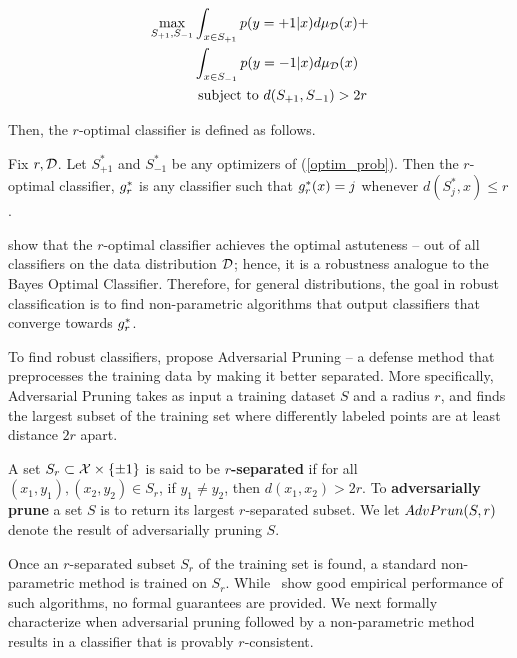 \begin{equation}\label{optim_prob}
\begin{split}
\max_{S_{+1}, S_{-1}} &\int_{x \in S_{+1}} p(y=+1|x)d\mu_{{\mathcal D}}(x) + \\
&\int_{x \in S_{-1}} p(y=-1|x)d\mu_{{\mathcal D}}(x) \\
&\text{ subject to } d(S_{+1}, S_{-1}) > 2r 
\end{split}
\end{equation}

Then, the $r$-optimal classifier is defined as follows. 

\begin{defn}
\cite{YRWC19} Fix $r, {\mathcal D}$. Let $S_{+1}^*$ and $S_{-1}^*$ be any optimizers of (\ref{optim_prob}). Then the $r$-optimal classifier, $g^*_r$ is any classifier such that $g^*_r(x) = j$ whenever $d(S_j^*, x) \leq r$. 
\end{defn}

\cite{YRWC19} show that the $r$-optimal classifier achieves the optimal astuteness -- out of all classifiers on the data distribution ${\mathcal D}$; hence, it is a robustness analogue to the Bayes Optimal Classifier. Therefore, for general distributions, the goal in robust classification is to find non-parametric algorithms that output classifiers that converge towards $g^*_r$. 

To find robust classifiers, \cite{YRWC19} propose Adversarial Pruning -- a defense method that preprocesses the training data by making it better separated. More specifically, Adversarial Pruning takes as input a training dataset $S$ and a radius $r$, and finds the largest subset of the training set where differently labeled points are at least distance $2r$ apart. 


\begin{defn}
A set $S_r \subset \mathcal X \times \{\pm 1\}$ is said to be \textbf{$r$-separated} if for all $(x_1, y_1), (x_2, y_2) \in S_r$, if $y_1 \neq y_2$, then $d(x_1, x_2) > 2r$. To \textbf{adversarially prune} a set $S$ is to return its largest $r$-separated subset. We let $AdvPrun(S, r)$ denote the result of adversarially pruning $S$.  
\end{defn}

Once an $r$-separated subset $S_r$ of the training set is found, a standard non-parametric method is trained on $S_r$.  While~\cite{YRWC19} show good empirical performance of such algorithms, no formal guarantees are provided. We next formally characterize when adversarial pruning followed by a non-parametric method results in a classifier that is provably $r$-consistent.

